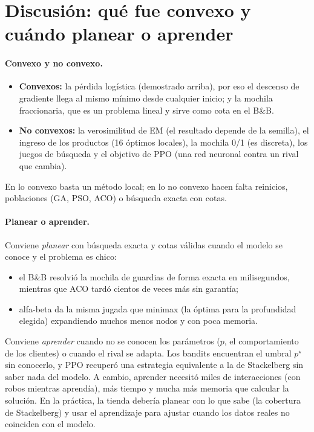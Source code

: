 \section*{Discusión: qué fue convexo y cuándo planear o aprender}
\label{p2:sec:discusion}

\paragraph{Convexo y no convexo.}
\begin{itemize}[itemsep=1pt]
  \item \textbf{Convexos:} la pérdida logística (demostrado arriba), por eso el descenso de gradiente llega al mismo mínimo desde cualquier inicio; y la mochila fraccionaria, que es un problema lineal y sirve como cota en el B\&B.
  \item \textbf{No convexos:} la verosimilitud de EM (el resultado depende de la semilla), el ingreso de los productos (16 óptimos locales), la mochila 0/1 (es discreta), los juegos de búsqueda y el objetivo de PPO (una red neuronal contra un rival que cambia).
\end{itemize}
En lo convexo basta un método local; en lo no convexo hacen falta reinicios, poblaciones (GA, PSO, ACO) o búsqueda exacta con cotas.

\paragraph{Planear o aprender.} Conviene \emph{planear} con búsqueda exacta y cotas válidas cuando el modelo se conoce y el problema es chico:
\begin{itemize}[itemsep=1pt]
  \item el B\&B resolvió la mochila de guardias de forma exacta en milisegundos, mientras que ACO tardó cientos de veces más sin garantía;
  \item alfa-beta da la misma jugada que minimax (la óptima para la profundidad elegida) expandiendo muchos menos nodos y con poca memoria.
\end{itemize}
Conviene \emph{aprender} cuando no se conocen los parámetros ($p$, el comportamiento de los clientes) o cuando el rival se adapta. Los bandits encuentran el umbral $p^\star$ sin conocerlo, y PPO recuperó una estrategia equivalente a la de Stackelberg sin saber nada del modelo. A cambio, aprender necesitó miles de interacciones (con robos mientras aprendía), más tiempo y mucha más memoria que calcular la solución. En la práctica, la tienda debería planear con lo que sabe (la cobertura de Stackelberg) y usar el aprendizaje para ajustar cuando los datos reales no coinciden con el modelo.

